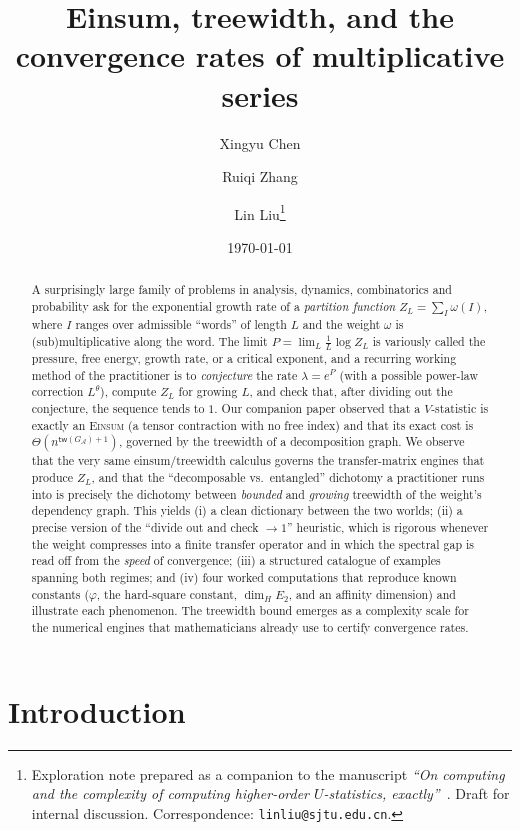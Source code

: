 \documentclass[11pt]{article}
\title{\bf Einsum, treewidth, and the convergence rates of
       multiplicative series}
\author{Xingyu Chen \and Ruiqi Zhang \and Lin Liu\thanks{%
  Exploration note prepared as a companion to the manuscript
  \emph{``On computing and the complexity of computing higher-order
  $U$-statistics, exactly''}~\citep{chen2024ustats}. Draft for internal
  discussion. Correspondence: \texttt{linliu@sjtu.edu.cn}.}}
\date{\today}
\newcommand{\Einsum}{\textsc{Einsum}}
\newcommand{\calA}{\mathcal{A}}
\newcommand{\tw}{\mathsf{tw}}
\newcommand{\treewidthp}[1]{\tw(#1)}
\newcommand{\graphform}[1]{G_{#1}}
\newcommand{\pressure}{P}
\theoremstyle{plain}
\theoremstyle{definition}
\theoremstyle{remark}
\begin{document}
\maketitle

\begin{abstract}
A surprisingly large family of problems in analysis, dynamics, combinatorics
and probability ask for the exponential growth rate of a \emph{partition
function} $Z_L=\sum_{I}\omega(I)$, where $I$ ranges over admissible
``words'' of length $L$ and the weight $\omega$ is (sub)multiplicative along
the word. The limit $\pressure=\lim_{L}\tfrac1L\log Z_L$ is variously called the
pressure, free energy, growth rate, or a critical exponent, and a recurring
working method of the practitioner is to \emph{conjecture} the rate
$\lambda=e^{\pressure}$ (with a possible power-law correction $L^\theta$),
compute $Z_L$ for growing $L$, and check that, after dividing out the conjecture,
the sequence tends to $1$. Our companion paper observed that a $V$-statistic is
exactly an \Einsum{} (a tensor contraction with no free index) and that its exact
cost is $\Theta(n^{\treewidthp{\graphform{\calA}}+1})$, governed by the treewidth
of a decomposition graph. We observe that the very same einsum/treewidth calculus
governs the transfer-matrix engines that produce $Z_L$, and that the
``decomposable vs.\ entangled'' dichotomy a practitioner runs into is precisely
the dichotomy between \emph{bounded} and \emph{growing} treewidth of the weight's
dependency graph. This yields (i) a clean dictionary between the two worlds;
(ii) a precise version of the ``divide out and check $\to 1$'' heuristic, which
is rigorous whenever the weight compresses into a finite transfer operator and in
which the spectral gap is read off from the \emph{speed} of convergence;
(iii) a structured catalogue of examples spanning both regimes; and (iv) four
worked computations that reproduce known constants
($\varphi$, the hard-square constant, $\dim_H E_2$, and an affinity dimension) and
illustrate each phenomenon. The treewidth bound emerges as a complexity scale for
the numerical engines that mathematicians already use to certify convergence
rates.
\end{abstract}

\tableofcontents

\section{Introduction}
\label{sec:intro}
\end{document}
